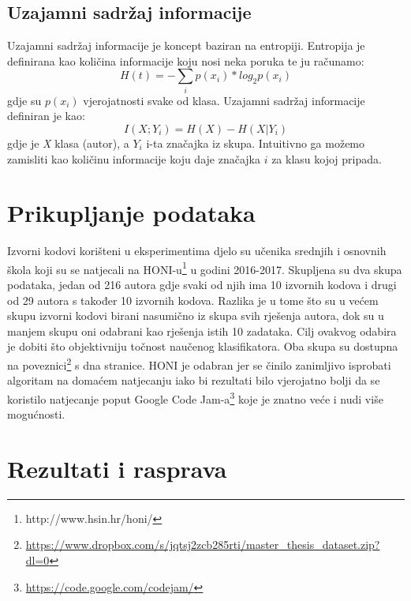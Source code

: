 \subsection{Uzajamni sadržaj informacije} \label{entropy}

Uzajamni sadržaj informacije je koncept baziran na entropiji. Entropija je definirana kao količina informacije koju nosi neka poruka te ju računamo:
\begin{equation}
		H(t) = - \sum_{i} p(x_{i}) * log_2 p(x_{i})
\end{equation}
gdje su $p(x_{i})$ vjerojatnosti svake od klasa. \newline
Uzajamni sadržaj informacije definiran je kao:
\begin{equation}
		I(X;Y_{i}) = H(X) - H(X | Y_{i})
\end{equation}
gdje je \textit{X} klasa (autor), a $Y_{i}$ i-ta značajka iz skupa. Intuitivno ga možemo zamisliti kao količinu informacije koju daje značajka $i$ za klasu kojoj pripada.

\section{Prikupljanje podataka}
Izvorni kodovi korišteni u eksperimentima djelo su učenika srednjih i osnovnih škola koji su se natjecali na HONI-u\footnote{http://www.hsin.hr/honi/} u godini 2016-2017. Skupljena su dva skupa podataka, jedan od 216 autora gdje svaki od njih ima 10 izvornih kodova i drugi od 29 autora s također 10 izvornih kodova. Razlika je u tome što su u većem skupu izvorni kodovi birani nasumično iz skupa svih rješenja autora, dok su u manjem skupu oni odabrani kao rješenja istih 10 zadataka. Cilj ovakvog odabira  je dobiti što objektivniju točnost naučenog klasifikatora. Oba skupa su dostupna na poveznici\footnote{\url{https://www.dropbox.com/s/jqtsj2zcb285rti/master_thesis_dataset.zip?dl=0}} s dna stranice. HONI je odabran jer se činilo zanimljivo isprobati algoritam na domaćem natjecanju iako bi rezultati bilo vjerojatno bolji da se koristilo natjecanje poput Google Code Jam-a\footnote{\url{https://code.google.com/codejam/}} koje je znatno veće i nudi više mogućnosti. 

\section{Rezultati i rasprava} \label{results}

